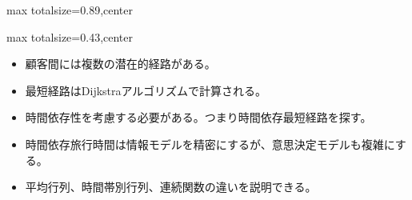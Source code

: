 \begin{minipage}[t]{0.58\textwidth}
\begin{adjustbox}{max totalsize={\textwidth}{0.89\textheight},center}
\begin{minipage}{\textwidth}
\end{minipage}
\end{adjustbox}
\end{minipage}


\clearpage
{}
\begin{minipage}[t]{0.405\textwidth}
\begin{adjustbox}{max totalsize={\textwidth}{0.43\textheight},center}
\begin{minipage}{\textwidth}\scriptsize
{}\begin{itemize}
\item 顧客間には複数の潜在的経路がある。
\item 最短経路はDijkstraアルゴリズムで計算される。
\item 時間依存性を考慮する必要がある。つまり時間依存最短経路を探す。
\end{itemize}\begin{itemize}
\item 時間依存旅行時間は情報モデルを精密にするが、意思決定モデルも複雑にする。
\item 平均行列、時間帯別行列、連続関数の違いを説明できる。
\end{itemize}
\end{minipage}
\end{adjustbox}
\end{minipage}\hfill
